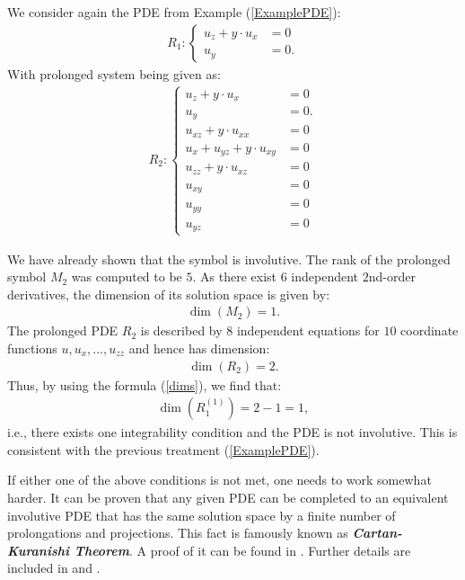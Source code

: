 \begin{example}
We consider again the PDE from Example (\ref{ExamplePDE}):
\begin{align}
    R_1 : \begin{cases} u_z + y \cdot u_x &= 0\\
                        u_y &= 0.
            \end{cases}
\end{align}
With prolonged system being given as:
\begin{align}
    R_2 : \begin{cases} u_z + y \cdot u_x &= 0 \\
                        u_y &= 0. \\
                        u_{xz} + y \cdot u_{xx} &= 0 \\
                        u_x + u_{yz} + y \cdot u_{xy} &= 0 \\
                        u_{zz} + y \cdot u_{xz} &= 0 \\
                        u_{xy} &= 0 \\
                        u_{yy} &= 0 \\
                        u_{yz} &= 0 
            \end{cases}
\end{align}

We have already shown that the symbol is involutive. 
The rank of the prolonged symbol $M_2$ was computed to be $5$. As there exist $6$ independent $2$nd-order derivatives, the dimension of its solution space is given by:
\begin{align}
    \operatorname{dim}(M_2) = 1.
\end{align}
The prolonged PDE $R_2$ is described by $8$ independent equations for $10$ coordinate functions $u,u_x,...,u_{zz}$ and hence has dimension:
\begin{align}
    \operatorname{dim}(R_2) = 2.
\end{align}
Thus, by using the formula (\ref{dims}), we find that:
\begin{align}
    \operatorname{dim}(R_1^{(1)}) = 2 - 1 = 1,
\end{align}
i.e., there exists one integrability condition and the PDE is not involutive. This is consistent with the previous treatment (\ref{ExamplePDE}).
\end{example}


If either one of the above conditions is not met, one needs to work somewhat harder. It can be proven that any given PDE can be completed to an equivalent involutive PDE that has the same solution space by a finite number of prolongations and projections. This fact is famously known as \textbf{\textit{Cartan-Kuranishi Theorem}}. A proof of it can be found in \cite{sweeney1968}. Further details are included in \cite{seiler2009involution} and \cite{seiler1994analysis}.

